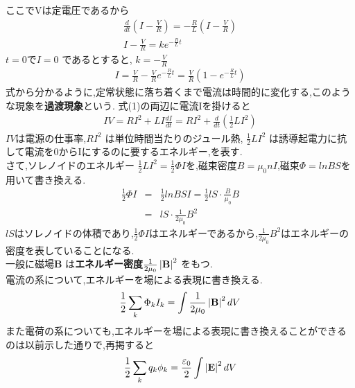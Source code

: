 \documentclass[../main]{subfiles}
\begin{document}
ここでVは定電圧であるから
\begin{eqnarray*}
\frac{d}{dt} \left( I - \frac{V}{R} \right) =  -\frac{R}{L} \left( I - \frac{V}{R} \right) \\
I - \frac{V}{R} = k e^{-\frac{R}{L}t}
\end{eqnarray*}
$t=0$で$I=0$ であるとすると, $k=-\frac{V}{R}$
\begin{eqnarray*}
I = \frac{V}{R} - \frac{V}{R} e^{-\frac{R}{L}t} = \frac{V}{R} \left( 1 - e^{-\frac{R}{L}t} \right)
\end{eqnarray*}
式から分かるように,定常状態に落ち着くまで電流は時間的に変化する,このような現象を{\bf 過渡現象}という.
式(1)の両辺に電流Iを掛けると
\begin{eqnarray*}
IV = RI^2 + LI \frac{dI}{dt} = RI^2 + \frac{d}{dt} \left( \frac{1}{2} LI^2 \right)
\end{eqnarray*}
$IV$は電源の仕事率,$RI^2$ は単位時間当たりのジュール熱, $\frac{1}{2} LI^2$ は誘導起電力に抗して電流を0からIにするのに要するエネルギー,を表す. \\
さて,ソレノイドのエネルギー $\frac{1}{2} LI^2=\frac{1}{2} \Phi I$を,磁束密度$B=\mu_0 n I$,磁束$\Phi = lnBS$を用いて書き換える.
\begin{eqnarray*}
\frac{1}{2} \Phi I &=& \frac{1}{2} lnBSI = \frac{1}{2} lS \cdot \frac{B}{\mu_0} B \\
&=& lS \cdot \frac{1}{2\mu_0}B^2
\end{eqnarray*}
$lS$はソレノイドの体積であり,$\frac{1}{2} \Phi I$はエネルギーであるから,$\frac{1}{2\mu_0}B^2$はエネルギーの密度を表していることになる. \\
一般に磁場{\bf B} は{\bf エネルギー密度}$\frac{1}{2\mu_0}\left| {\bf B} \right|^2$ をもつ. \\
電流の系について,エネルギーを場による表現に書き換える.
\begin{eqnarray*}
\frac{1}{2} \sum_{k} \Phi_{k} I_{k} = \int \frac{1}{2 \mu_0} \left| {\bf B} \right|^2 dV
\end{eqnarray*}
また電荷の系についても,エネルギーを場による表現に書き換えることができるのは以前示した通りで,再掲すると \\
\begin{eqnarray*}
\frac{1}{2} \sum_{k} q_k \phi_k = \frac{\varepsilon_0}{2} \int \left| {\bf E} \right|^2 dV
\end{eqnarray*}
\end{document}
